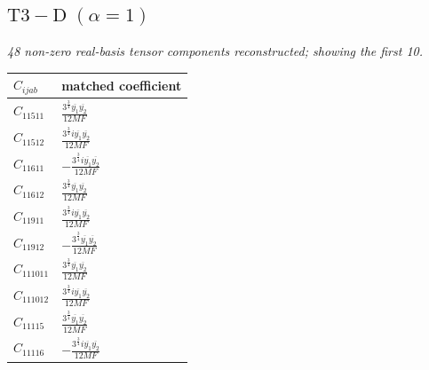 \documentclass[9pt]{article}
\begin{document}
\subsection*{$ \mathrm{T3-D}\;(\alpha=1) $}
\textit{48 non-zero real-basis tensor components reconstructed; showing the first 10.}
\begin{longtable}{@{}ll@{}}
\toprule
$C_{ijab}$ & matched coefficient \\
\midrule
$C_{11511}$ & $ \frac{3^{\frac{3}{4}} \overline{y_{1}} \overline{y_{2}}}{12 MF} $ \\
$C_{11512}$ & $ \frac{3^{\frac{3}{4}} i \overline{y_{1}} \overline{y_{2}}}{12 MF} $ \\
$C_{11611}$ & $ - \frac{3^{\frac{3}{4}} i \overline{y_{1}} \overline{y_{2}}}{12 MF} $ \\
$C_{11612}$ & $ \frac{3^{\frac{3}{4}} \overline{y_{1}} \overline{y_{2}}}{12 MF} $ \\
$C_{11911}$ & $ \frac{3^{\frac{3}{4}} i \overline{y_{1}} \overline{y_{2}}}{12 MF} $ \\
$C_{11912}$ & $ - \frac{3^{\frac{3}{4}} \overline{y_{1}} \overline{y_{2}}}{12 MF} $ \\
$C_{111011}$ & $ \frac{3^{\frac{3}{4}} \overline{y_{1}} \overline{y_{2}}}{12 MF} $ \\
$C_{111012}$ & $ \frac{3^{\frac{3}{4}} i \overline{y_{1}} \overline{y_{2}}}{12 MF} $ \\
$C_{11115}$ & $ \frac{3^{\frac{3}{4}} \overline{y_{1}} \overline{y_{2}}}{12 MF} $ \\
$C_{11116}$ & $ - \frac{3^{\frac{3}{4}} i \overline{y_{1}} \overline{y_{2}}}{12 MF} $ \\
\bottomrule
\end{longtable}
\end{document}
